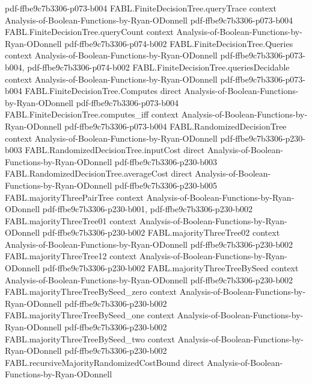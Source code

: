 \begin{theorem}
  {pdf-ffbe9c7b3306-p073-b004}
\proofstep
  {FABL.FiniteDecisionTree.queryTrace}
  {context}
  {Analysis-of-Boolean-Functions-by-Ryan-ODonnell}
  {pdf-ffbe9c7b3306-p073-b004}
\proofstep
  {FABL.FiniteDecisionTree.queryCount}
  {context}
  {Analysis-of-Boolean-Functions-by-Ryan-ODonnell}
  {pdf-ffbe9c7b3306-p074-b002}
\proofstep
  {FABL.FiniteDecisionTree.Queries}
  {context}
  {Analysis-of-Boolean-Functions-by-Ryan-ODonnell}
  {pdf-ffbe9c7b3306-p073-b004,
    pdf-ffbe9c7b3306-p074-b002}
\proofstep
  {FABL.FiniteDecisionTree.queriesDecidable}
  {context}
  {Analysis-of-Boolean-Functions-by-Ryan-ODonnell}
  {pdf-ffbe9c7b3306-p073-b004}
\proofstep
  {FABL.FiniteDecisionTree.Computes}
  {direct}
  {Analysis-of-Boolean-Functions-by-Ryan-ODonnell}
  {pdf-ffbe9c7b3306-p073-b004}
\proofstep
  {FABL.FiniteDecisionTree.computes_iff}
  {context}
  {Analysis-of-Boolean-Functions-by-Ryan-ODonnell}
  {pdf-ffbe9c7b3306-p073-b004}
\proofstep
  {FABL.RandomizedDecisionTree}
  {context}
  {Analysis-of-Boolean-Functions-by-Ryan-ODonnell}
  {pdf-ffbe9c7b3306-p230-b003}
\proofstep
  {FABL.RandomizedDecisionTree.inputCost}
  {direct}
  {Analysis-of-Boolean-Functions-by-Ryan-ODonnell}
  {pdf-ffbe9c7b3306-p230-b003}
\proofstep
  {FABL.RandomizedDecisionTree.averageCost}
  {direct}
  {Analysis-of-Boolean-Functions-by-Ryan-ODonnell}
  {pdf-ffbe9c7b3306-p230-b005}
\proofstep
  {FABL.majorityThreePairTree}
  {context}
  {Analysis-of-Boolean-Functions-by-Ryan-ODonnell}
  {pdf-ffbe9c7b3306-p230-b001,
    pdf-ffbe9c7b3306-p230-b002}
\proofstep
  {FABL.majorityThreeTree01}
  {context}
  {Analysis-of-Boolean-Functions-by-Ryan-ODonnell}
  {pdf-ffbe9c7b3306-p230-b002}
\proofstep
  {FABL.majorityThreeTree02}
  {context}
  {Analysis-of-Boolean-Functions-by-Ryan-ODonnell}
  {pdf-ffbe9c7b3306-p230-b002}
\proofstep
  {FABL.majorityThreeTree12}
  {context}
  {Analysis-of-Boolean-Functions-by-Ryan-ODonnell}
  {pdf-ffbe9c7b3306-p230-b002}
\proofstep
  {FABL.majorityThreeTreeBySeed}
  {context}
  {Analysis-of-Boolean-Functions-by-Ryan-ODonnell}
  {pdf-ffbe9c7b3306-p230-b002}
\proofstep
  {FABL.majorityThreeTreeBySeed_zero}
  {context}
  {Analysis-of-Boolean-Functions-by-Ryan-ODonnell}
  {pdf-ffbe9c7b3306-p230-b002}
\proofstep
  {FABL.majorityThreeTreeBySeed_one}
  {context}
  {Analysis-of-Boolean-Functions-by-Ryan-ODonnell}
  {pdf-ffbe9c7b3306-p230-b002}
\proofstep
  {FABL.majorityThreeTreeBySeed_two}
  {context}
  {Analysis-of-Boolean-Functions-by-Ryan-ODonnell}
  {pdf-ffbe9c7b3306-p230-b002}
\proofstep
  {FABL.recursiveMajorityRandomizedCostBound}
  {direct}
  {Analysis-of-Boolean-Functions-by-Ryan-ODonnell}

\end{theorem}
